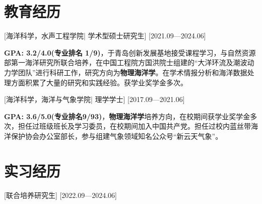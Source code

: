 \documentclass{resume}
\begin{document}


\ResumeTitle


\section{教育经历}
[\textnormal{海洋科学，水声工程学院|}  学术型硕士研究生]
[2021.09—2024.06]

\textbf{GPA: 3.2/4.0(专业排名 1/9)}，于青岛创新发展基地接受课程学习，与自然资源部第一海洋研究所联合培养，在中国工程院方国洪院士组建的“大洋环流及潮波动力学团队”进行科研工作，研究方向为\textbf{物理海洋学}。在学术情报分析和海洋数据处理方面积累了大量的研究和实践经验。获学业奖学金多次。


[\textnormal{海洋科学，海洋与气象学院|} 理学学士]
[2017.09—2021.06]

\textbf{GPA: 3.6/5.0(专业排名9/93)}，\textbf{物理海洋学}培养方向，在校期间获学业奖学金多次，担任过班级班长及学习委员，在校期间加入中国共产党。担任过校内蓝丝带海洋保护协会办公室部长，参与组建气象领域知名公众号“新云天气象”。






\section{实习经历}

[联合培养研究生]
[2022.09—2024.06] 
\end{document}
